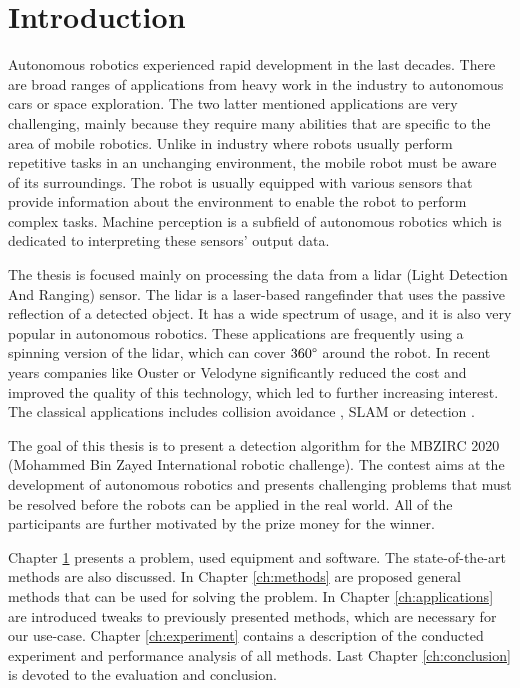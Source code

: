 \chapter{Introduction}
\label{ch:intro}
Autonomous robotics experienced rapid development in the last decades. There are broad ranges of applications from heavy work in the industry to autonomous cars or space exploration. The two latter mentioned applications are very challenging, mainly because they require many abilities that are specific to the area of mobile robotics. Unlike in industry where robots usually perform repetitive tasks in an unchanging environment, the mobile robot must be aware of its surroundings. The robot is usually equipped with various sensors that provide information about the environment to enable the robot to perform complex tasks. Machine perception is a subfield of autonomous robotics which is dedicated to interpreting these sensors' output data.

The thesis is focused mainly on processing the data from a lidar (Light Detection And Ranging) sensor. The lidar is a laser-based rangefinder that uses the passive reflection of a detected object. It has a wide spectrum of usage, and it is also very popular in autonomous robotics. These applications are frequently using a spinning version of the lidar, which can cover $360\degree$ around the robot. In recent years companies like Ouster or Velodyne significantly reduced the cost and improved the quality of this technology, which led to further increasing interest. The classical applications includes collision avoidance \cite{sabatini2007}, SLAM \cite{kohlbrecher2017} or detection \cite{himmelsbach2008}.

The goal of this thesis is to present a detection algorithm for the MBZIRC 2020 (Mohammed Bin Zayed International robotic challenge). The contest aims at the development of autonomous robotics and presents challenging problems that must be resolved before the robots can be applied in the real world. All of the participants are further motivated by the prize money for the winner.

Chapter \ref{ch:intro} presents a problem, used equipment and software. The state-of-the-art methods are also discussed. In Chapter \ref{ch:methods} are proposed general methods that can be used for solving the problem. In Chapter \ref{ch:applications} are introduced tweaks to previously presented methods, which are necessary for our use-case. Chapter \ref{ch:experiment} contains a description of the conducted experiment and performance analysis of all methods. Last Chapter \ref{ch:conclusion} is devoted to the evaluation and conclusion.

